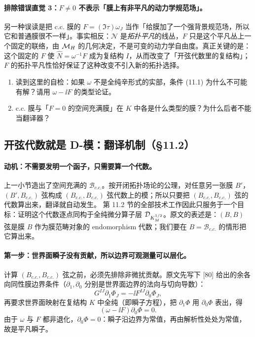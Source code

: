 \paragraph{排除错误直觉 3：\(F\neq0\) 不表示「膜上有非平凡的动力学规范场」。}另一种误读是把 c.c. 膜的 \(F=(\Im\tau)\omega_J\) 当作「给膜加了一个强背景规范场，所以它和普通膜很不一样」。事实相反：\(\mathcal N\) 是\emph{拓扑平凡}的线丛，\(F\) 只是这个平凡丛上一个固定的联络，由 \(\mathcal{M}_H\) 的几何决定，不是可变的动力学自由度。真正关键的是：这个固定的 \(F\) 使 \(\hat N=\omega^{-1}F\) 成为复结构 \(I\)，从而改变了「开弦代数里的复结构」；\(F\) 的拓扑平凡性恰好保证了这种改变不引入新的拓扑选择。\pA{}

\begin{enumerate}
\item 读到这里的自检：如果 \(\omega\) 不是全纯辛形式的实部，条件 (11.1) 为什么不可能有解？请用 \(\omega-\ii F\) 的类型论证。
\item c.c. 膜与「\(F=0\) 的空间充满膜」在 \(K\) 中各是什么类型的膜？为什么后者不能当翻译器？
\end{enumerate}

\subsection{开弦代数就是 D-模：翻译机制（\S11.2）}
\label{subsec:translation}

\paragraph{动机：不需要发明一个函子，只需要算一个代数。}上一小节造出了空间充满的 \(\mathcal B_{c.c.}\)。按开闭拓扑场论的公理，对任意另一张膜 \(B'\)，\((B',B_{c.c.})\) 弦构成 \((B_{c.c.},B_{c.c.})\) 弦代数上的模；所以只要把 \((B_{c.c.},B_{c.c.})\) 弦的代数算出来，翻译就自动发生。\pA{} 第 11.2 节的全部技术工作因此只服务于一个目标：证明这个代数逐点同构于全纯微分算子层 \(\mathcal{D}_{K_M^{1/2}}\)。原文的表述是：\((B,B)\) 弦是膜 \(B\) 作为膜范畴对象的 endomorphism 代数；我们要在 \(B=\mathcal B_{c.c.}\) 的情形把它算出来。\pA{}

\paragraph{第一步：世界面瞬子没有贡献，所以边界可观测量可以层化。}计算 \((B_{c.c.},B_{c.c.})\) 弦之前，必须先排除非微扰贡献。原文先写下 [80] 给出的余各向同性膜边界条件（\(\partial_1,\partial_0\) 分别是世界面边界的法向与切向导数）：
\begin{equation}
G^{IJ}\partial_1\Phi_J=-\ii F^{IJ}\partial_0\Phi_J,
\label{eq:coiso-bc}
\end{equation}
再要求世界面映射在复结构 \(K\) 中全纯（即瞬子方程），把 \(\partial_1\Phi\) 用 \(\partial_0\Phi\) 表出，得
\begin{equation}
(\omega-\ii F)\partial_0\Phi=0.
\label{eq:instanton-kill}
\end{equation}
由于 \(\omega\) 与 \(F\) 都非退化，\(\partial_0\Phi=0\)：瞬子沿边界为常值，再由解析性处处为常值，故是平凡瞬子。\pA{}

